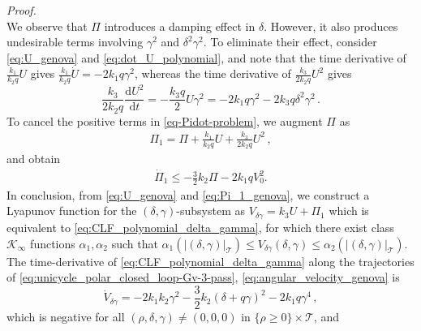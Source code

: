 \documentclass[journal,twoside,web]{ieeecolor}
\theoremstyle{definition}
\newcommand{\abs}[1]{\left\lvert#1\right\rvert}
\newcommand{\ddt}[1]{\frac{\mathrm{d}#1}{\mathrm{d}t}}
\renewenvironment{proof}[1][Proof]{\par\pushQED{\qed}\normalfont\textit{#1.}~}{\popQED\par}
\begin{document}
\begin{proof}
\begin{equation}
\end{equation}
We observe that $\Pi$  introduces a damping effect in $\delta$. However, it also produces undesirable terms involving $\gamma^2$ and $\delta^2 \gamma^2$. To eliminate their effect, consider \eqref{eq:U_genova} and \eqref{eq:dot_U_polynomial}, and note that the time derivative of $\frac{k_1}{k_2 q}U$ gives $\frac{k_1}{k_2 q}\dot{U} = -2k_1 q \gamma^2$, whereas the time derivative of $\frac{k_3}{2k_2 q}U^2$ gives
\begin{equation}
\frac{k_3 }{2 k_2 q}\ddt{U^2}  = 
- \frac{ k_3 q }{ 2} 
U  \gamma^2
=-2 k_1 q \gamma^2 - 2 k_3 q  \delta^2 \gamma^2\,.
\end{equation}
To cancel the positive terms in \eqref{eq-Pidot-problem}, we augment  $\Pi$ as
\begin{align}
\Pi_1= \Pi+ \frac{k_1}{k_2 q} U +  \frac{k_3}{2k_2 q}U^2 \,,
\label{eq:Pi_1_genova}
\end{align}
and obtain
\begin{align}
\dot\Pi_1\leq - \frac{3}{2} k_2 \Pi -   2 k_1 q V_0^2. \label{eq:V_dot_SD}
\end{align}
In conclusion, from \eqref{eq:U_genova} and \eqref{eq:Pi_1_genova}, we construct a Lyapunov function for the $(\delta,\gamma)$-subsystem as $V_{\delta \gamma} = k_3 U + \Pi_1$ which is equivalent to \eqref{eq:CLF_polynomial_delta_gamma}, 
for which there exist class $\mathcal{K}_{\infty}$ functions $\alpha_1, \alpha_2$ such that $\alpha_1(\abs{(\delta,\gamma)}_{\mathcal{T}}) \le V_{\delta \gamma }(\delta, \gamma) \le \alpha_2(\abs{(\delta,\gamma)}_{\mathcal{T}})$. The time-derivative of \eqref{eq:CLF_polynomial_delta_gamma} along the trajectories of \eqref{eq:unicycle_polar_closed_loop-Gv-3-pass}, \eqref{eq:angular_velocity_genova} is 
\begin{equation}
\dot{V}_{\delta \gamma} = - 2 k_1k_2\gamma^2 - \frac{3}{2} k_2 (\delta + q \gamma)^2 -   2 k_1 q \gamma^4\,,
\end{equation}
which is negative for all $(\rho,\delta, \gamma) \ne (0,0,0)$ in $\{\rho \ge 0\} \times \mathcal{T}$, and 

\end{proof}
\end{document}
